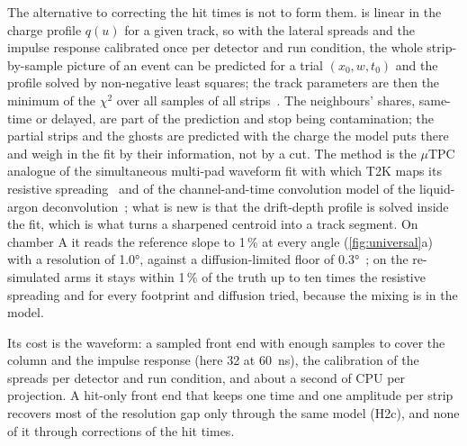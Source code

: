 The alternative to correcting the hit times is not to form them.  is linear in the charge profile $q(u)$ for
a given track, so with the lateral spreads and the impulse response calibrated once per detector and run condition, the whole
strip-by-sample picture of an event can be predicted for a trial $(x_0, w, t_0)$ and the profile solved by non-negative least
squares; the track parameters are then the minimum of the $\chi^2$ over all samples of all strips~\cite{paperII}. The neighbours'
shares, same-time or delayed, are part of the prediction and stop being contamination; the partial strips and the ghosts are
predicted with the charge the model puts there and weigh in the fit by their information, not by a cut. The method is the
$\mu$TPC analogue of the simultaneous multi-pad waveform fit with which T2K maps its resistive spreading~\cite{T2K2023} and of
the channel-and-time convolution model of the liquid-argon deconvolution~\cite{Adams2018a}; what is new is that the drift-depth
profile is solved inside the fit, which is what turns a sharpened centroid into a track segment. On chamber A it reads the
reference slope to 1\,\% at every angle (\cref{fig:universal}a) with a resolution of \ang{1.0}, against a diffusion-limited floor of
\ang{0.3}~\cite{paperII}; on the re-simulated arms it stays within 1\,\% of the truth up to ten times the resistive spreading and for
every footprint and diffusion tried, because the mixing is in the model.

Its cost is the waveform: a sampled front end with enough samples to cover the column and the impulse response (here 32 at
\SI{60}{ns}), the calibration of the spreads per detector and run condition, and about a second of CPU per projection. A
hit-only front end that keeps one time and one amplitude per strip recovers most of the resolution gap only through the same
model (H2c), and none of it through corrections of the hit times.
